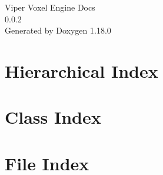 \documentclass[twoside]{book}
\newcommand{\+}{\discretionary{\mbox{\scriptsize$\hookleftarrow$}}{}{}}
\newcommand{\clearemptydoublepage}{%
    \newpage{\pagestyle{empty}\cleardoublepage}%
  }
\begin{document}
  \raggedbottom
    \hypersetup{pageanchor=false,
                bookmarksnumbered=true,
                pdfencoding=unicode
               }
  \begin{titlepage}
  \vspace*{7cm}
  \begin{center}%
  {\Large Viper Voxel Engine Docs}\\
  [1ex]\large 0.\+0.\+2 \\
  \vspace*{1cm}
  {\large Generated by Doxygen 1.18.0}\\
  \end{center}
  \end{titlepage}
  \clearemptydoublepage
  \tableofcontents
  \clearemptydoublepage
  \hypersetup{pageanchor=true}

\chapter{Hierarchical Index}

\chapter{Class Index}

\chapter{File Index}

\end{document}
